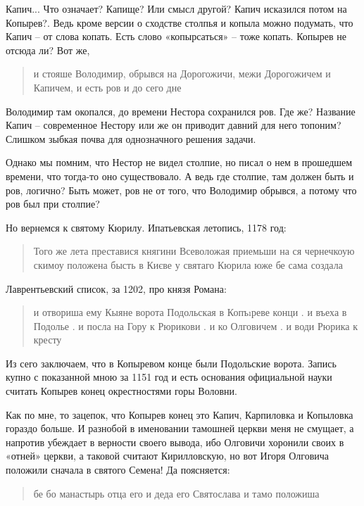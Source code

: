 Капич... Что означает? Капище? Или смысл другой? Капич исказился потом на Копырев?. Ведь кроме версии о сходстве столпья и копыла можно подумать, что Капич – от слова копать. Есть слово «копырсаться» – тоже копать. Копырев не отсюда ли? Вот же,

\begin{quotation}
и стояше Володимир, обрывся на Дорогожичи, межи Дорогожичем и Капичем, и есть ров и до сего дне
\end{quotation}

Володимир там окопался, до времени Нестора сохранился ров. Где же? Название Капич – современное Нестору или же он приводит давний для него топоним? Слишком зыбкая почва для однозначного решения задачи.

Однако мы помним, что Нестор не видел столпие, но писал о нем в прошедшем времени, что тогда-то оно существовало. А ведь где столпие, там должен быть и ров, логично? Быть может, ров не от того, что Володимир обрывся, а потому что ров был при столпие? 

Но вернемся к святому Кюрилу. Ипатьевская летопись, 1178 год:

\begin{quotation}
Того же лета преставися княгини Всеволожая приемьши на ся чернечкоую скимоу положена бысть в Києве у святаго Кюрила юже бе сама создала
\end{quotation}

Лаврентьевский список, за 1202, про князя Романа:

\begin{quotation}
и отвориша ему Кыяне ворота Подольская в Копъıреве конци . и въеха в Подолье . и посла на Гору к Рюрикови . и ко Олговичем . и води Рюрика к кресту
\end{quotation}

Из сего заключаем, что в Копыревом конце были Подольские ворота. Запись купно с показанной мною за 1151 год и есть основания официальной науки считать Копырев конец окрестностями горы Воловни.

Как по мне, то зацепок, что Копырев конец это Капич, Карпиловка и Копыловка гораздо больше. И разнобой в именовании тамошней церкви меня не смущает, а напротив убеждает в верности своего вывода, ибо Олговичи хоронили своих в «отней» церкви, а таковой считают Кирилловскую, но вот Игоря Олговича положили сначала в святого Семена! Да поясняется:

\begin{quotation}
бе бо манастырь отца его и деда его Святослава и тамо положиша
\end{quotation}

